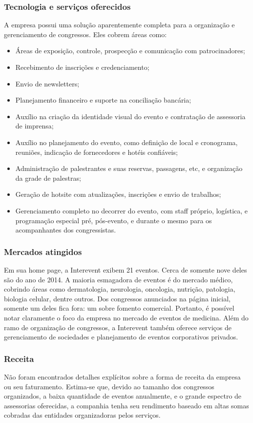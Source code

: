 \documentclass[a4paper]{abntex2}
\begin{document}
\subsubsection*{Tecnologia e serviços oferecidos}
A empresa possui uma solução aparentemente completa para a organização e gerenciamento de congressos. Eles cobrem áreas como:
\begin{itemize}[itemsep=-1ex]
	\item Áreas de exposição, controle, prospecção e comunicação com patrocinadores;
	\item Recebimento de inscrições e credenciamento;
	\item Envio de newsletters;
	\item Planejamento financeiro e suporte na conciliação bancária;
	\item Auxílio na criação da identidade visual do evento e contratação de assessoria de imprensa;
	\item Auxílio no planejamento do evento, como definição de local e cronograma, reuniões, indicação de fornecedores e hotéis confiáveis;
	\item Administração de palestrantes e suas reservas, passagens, etc, e organização da grade de palestras;
	\item Geração de hotsite com atualizações, inscrições e envio de trabalhos;
	\item Gerenciamento completo no decorrer do evento, com staff próprio, logística, e programação especial pré, pós-evento, e durante o mesmo para os acompanhantes dos congressistas.
\end{itemize}

\subsubsection*{Mercados atingidos}
Em sua home page\cite{interevent}, a Interevent exibem 21 eventos. Cerca de somente nove deles são do ano de 2014. A maioria esmagadora de eventos é do mercado médico, cobrindo áreas como dermatologia, neurologia, oncologia, nutrição, patologia, biologia celular, dentre outros. Dos congressos anunciados na página inicial, somente um deles fica fora: um sobre fomento comercial. Portanto, é possível notar claramente o foco da empresa no mercado de eventos de medicina. Além do ramo de organização de congressos, a Interevent também oferece serviços de gerenciamento de sociedades e planejamento de eventos corporativos privados.

\subsubsection*{Receita}
Não foram encontrados detalhes explícitos sobre a forma de receita da empresa ou seu faturamento. Estima-se que, devido ao tamanho dos congressos organizados, a baixa quantidade de eventos anualmente, e o grande espectro de assessorias oferecidas, a companhia tenha seu rendimento baseado em altas somas cobradas das entidades organizadoras pelos serviços.
\end{document}
